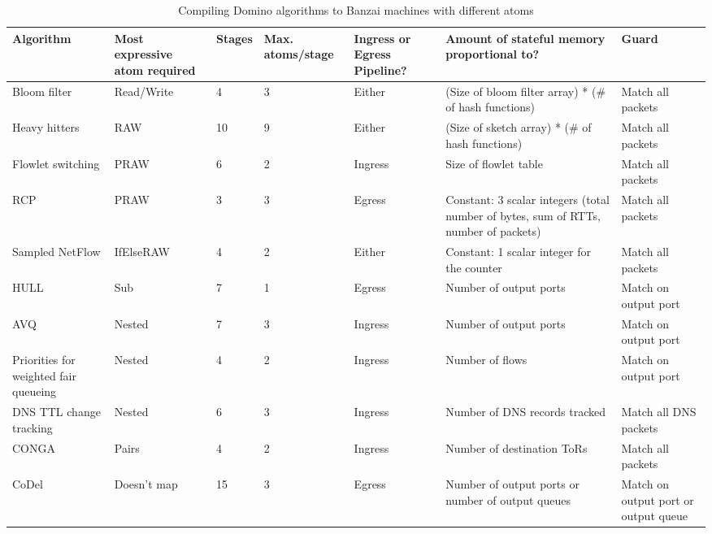 \begin{table}[!t]
\begin{small}
\begin{tabular}{|p{}|p{}|p{}|p{}|p{}|p{}|p{}|}
\hline
Algorithm & Most expressive atom required & Stages & Max. atoms/stage & Ingress or Egress Pipeline? & Amount of stateful memory proportional to? & Guard \\
\hline
Bloom filter & Read/Write & 4 & 3 & Either & (Size of bloom filter array) * (\# of hash functions) & Match all packets \\
\hline
Heavy hitters & RAW & 10 & 9 & Either & (Size of sketch array) * (\# of hash functions) & Match all packets \\
\hline
Flowlet switching & PRAW & 6 & 2 & Ingress & Size of flowlet table & Match all packets \\
\hline
RCP & PRAW & 3 & 3 & Egress & Constant: 3 scalar integers (total number of bytes, sum of RTTs, number of packets) & Match all packets \\
\hline
Sampled NetFlow & IfElseRAW & 4 & 2 & Either & Constant: 1 scalar integer for the counter & Match all packets \\
\hline
HULL & Sub & 7 & 1 & Egress & Number of output ports & Match on output port \\
\hline
AVQ & Nested & 7 & 3 & Ingress & Number of output ports & Match on output port \\
\hline
Priorities for weighted fair queueing & Nested & 4 & 2 & Ingress & Number of flows & Match on output port \\
\hline
DNS TTL change tracking~\cite{dns_change} & Nested & 6 & 3 & Ingress & Number of DNS records tracked & Match all DNS packets  \\
\hline
CONGA & Pairs & 4 & 2 & Ingress & Number of destination ToRs & Match all packets \\
\hline
CoDel & Doesn't map & 15 & 3 & Egress & Number of output ports or number of output queues & Match on output port or output queue \\
\hline
\end{tabular}
\end{small}
\caption{Compiling Domino algorithms to Banzai machines with different atoms}
\label{tab:algo_atoms}
\end{table}
